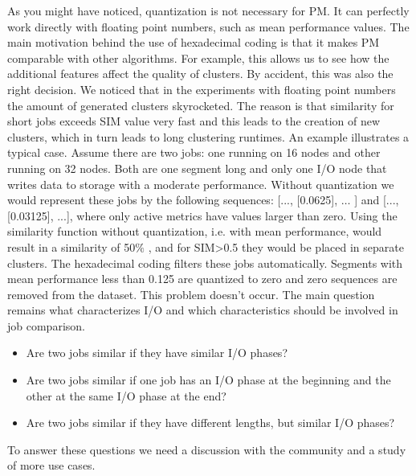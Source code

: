 \documentclass[]{llncs}
\begin{document}
{{{{As you might have noticed, quantization is not necessary for PM.
It can perfectly work directly with floating point numbers, such as mean performance values.
The main motivation behind the use of hexadecimal coding is that it makes PM comparable with other algorithms.
For example, this allows us to see how the additional features affect the quality of clusters.
By accident, this was also the right decision.
We noticed that in the experiments with floating point numbers the amount of generated clusters skyrocketed.
The reason is that similarity for short jobs exceeds SIM value very fast and this leads to the creation of new clusters, which in turn leads to long clustering runtimes.
An example illustrates a typical case.
Assume there are two jobs: one running on 16 nodes and other running on 32 nodes.
Both are one segment long and only one I/O node that writes data to storage with a moderate performance.
Without quantization we would represent these jobs by the following sequences:  [..., [0.0625], $ \ldots $ ] and [..., [0.03125], ...], where only active metrics have values larger than zero.
Using the similarity function without quantization, i.e. with mean performance, would result in a similarity of 50$\%$ , and for SIM>0.5 they would be placed in separate clusters.
The hexadecimal coding filters these jobs automatically. Segments with mean performance less than 0.125 are quantized to zero and zero sequences are removed from the dataset. This problem doesn’t occur.
The main question remains what characterizes I/O and which characteristics should be involved in job comparison.

\begin{itemize}
	\item Are two jobs similar if they have similar I/O phases?
	\item Are two jobs similar if one job has an I/O phase at the beginning and the other at the same I/O phase at the end?
	\item Are two jobs similar if they have different lengths, but similar I/O phases?
\end{itemize}

To answer these questions we need a discussion with the community and a study of more use cases.
}}}}
\end{document}
